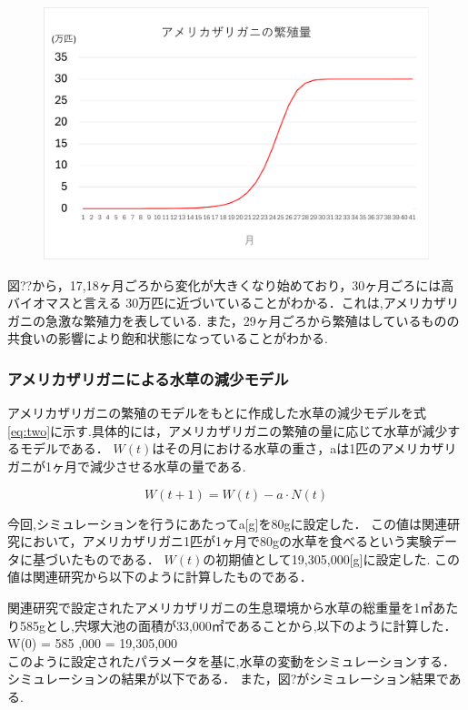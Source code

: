 \documentclass[12pt,a4j,titlepage]{ltjsarticle}
\begin{document}
 {\begin{figure}[h]
 \begin{center}
   \includegraphics[width=.95\columnwidth]{amezari_graph.pdf}
 \end{center}
 \end{figure}


 図??から，17,18ヶ月ごろから変化が大きくなり始めており，30ヶ月ごろには高バイオマスと言える 30万匹に近づいていることがわかる．これは,アメリカザリガニの急激な繁殖力を表している.
また，29ヶ月ごろから繁殖はしているものの共食いの影響により飽和状態になっていることがわかる.


\newpage
\subsubsection{アメリカザリガニによる水草の減少モデル}
アメリカザリガニの繁殖のモデルをもとに作成した水草の減少モデルを式\eqref{eq:two}に示す.具体的には，アメリカザリガニの繁殖の量に応じて水草が減少するモデルである．
$W(t)$はその月における水草の重さ，aは1匹のアメリカザリガニが1ヶ月で減少させる水草の量である.

\begin{equation}
  W(t+1) = W(t) - a \cdot N(t)\label{eq:two}
\end{equation}

今回,シミュレーションを行うにあたってa[g]を80gに設定した．
この値は関連研究において，アメリカザリガニ1匹が1ヶ月で80gの水草を食べるという実験データに基づいたものである．
$W(t)$の初期値として19,305,000[g]に設定した.
この値は関連研究から以下のように計算したものである．

関連研究で設定されたアメリカザリガニの生息環境から水草の総重量を1㎡あたり585gとし,宍塚大池の面積が33,000㎡であることから,以下のように計算した．\\
W(0) = 585 ,000 = 19,305,000 \, \\
このように設定されたパラメータを基に,水草の変動をシミュレーションする．
シミュレーションの結果が以下である．
また，図?がシミュレーション結果である.

}
\end{document}

